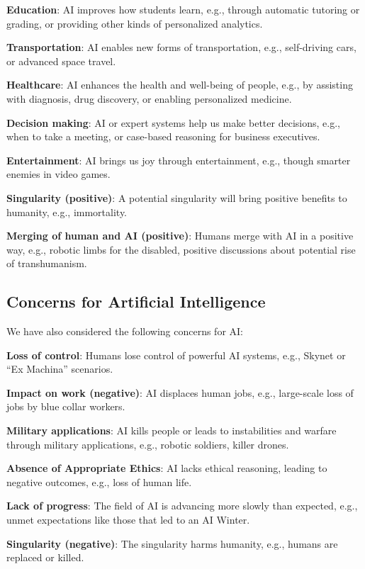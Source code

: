 \documentclass[letterpaper]{article}
\begin{document}
\textbf{Education}: AI improves how students learn, e.g., through automatic tutoring or grading, or providing other kinds of personalized analytics.

\textbf{Transportation}: AI enables new forms of transportation, e.g., self-driving cars, or advanced space travel.

\textbf{Healthcare}: AI enhances the health and well-being of people, e.g., by assisting with diagnosis, drug discovery, or enabling personalized medicine.

\textbf{Decision making}: AI or expert systems help us make better decisions, e.g., when to take a meeting, or case-based reasoning for business executives. 

\textbf{Entertainment}: AI brings us joy through entertainment, e.g., though smarter enemies in video games.

\textbf{Singularity (positive)}: A potential singularity will bring positive benefits to humanity, e.g., immortality.

\textbf{Merging of human and AI (positive)}: Humans merge with AI in a positive way, e.g., robotic limbs for the disabled, positive discussions about potential rise of transhumanism.

\subsection{Concerns for Artificial Intelligence}

We have also considered the following concerns for AI:

\textbf{Loss of control}: Humans lose control of powerful AI systems, e.g., Skynet or ``Ex Machina'' scenarios.

\textbf{Impact on work (negative)}: AI displaces human jobs, e.g., large-scale loss of jobs by blue collar workers.

\textbf{Military applications}: AI kills people or leads to instabilities and warfare through military applications, e.g., robotic soldiers, killer drones.

\textbf{Absence of Appropriate Ethics}: AI lacks ethical reasoning, leading to negative outcomes, e.g., loss of human life.

\textbf{Lack of progress}: The field of AI is advancing more slowly than expected, e.g., unmet expectations like those that led to an AI Winter. 

\textbf{Singularity (negative)}: The singularity harms humanity, e.g., humans are replaced or killed.
\end{document}
